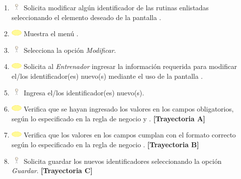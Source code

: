 \begin{enumerate}
	\item \includegraphics[width=15pt, height=10pt]{./Figuras/iconosCU/usuario.png} Solicita modificar algún identificador de las rutinas enlistadas seleccionando el elemento deseado de la pantalla .
	\item \includegraphics[width=15pt]{./Figuras/iconosCU/herramienta.png} Muestra el menú .
	\item \includegraphics[width=15pt, height=10pt]{./Figuras/iconosCU/usuario.png} Selecciona la opción \textit{Modificar}.
	\item \includegraphics[width=15pt]{./Figuras/iconosCU/herramienta.png} Solicita al \textit{Entrenador} ingresar la información requerida para modificar el/los identificador(es) nuevo(s) mediante el uso de la pantalla .
	\item \includegraphics[width=15pt, height=10pt]{./Figuras/iconosCU/usuario.png} Ingresa el/los identificador(es) nuevo(s).
	\item \includegraphics[width=15pt]{./Figuras/iconosCU/herramienta.png} Verifica que se hayan ingresado los valores en los campos obligatorios, según lo especificado en la regla de negocio  y . \textbf{[Trayectoria A]}
	\item \includegraphics[width=15pt]{./Figuras/iconosCU/herramienta.png} Verifica que los valores en los campos cumplan con el formato correcto según lo especificado en la regla de negocio . \textbf{[Trayectoria B]}
	\item \includegraphics[width=15pt, height=10pt]{./Figuras/iconosCU/usuario.png} Solicita guardar los nuevos identificadores seleccionando la opción \textit{Guardar}. \textbf{[Trayectoria C]}

\end{enumerate}

